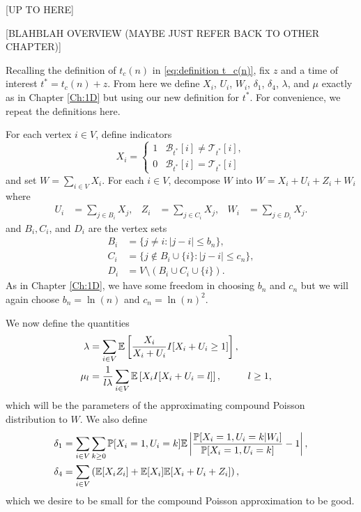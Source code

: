 [UP TO HERE]

[BLAHBLAH OVERVIEW (MAYBE JUST REFER BACK TO OTHER CHAPTER)]

Recalling the definition of $t_c(n)$ in \eqref{eq:definition t_c(n)}, fix $z$ and a time of interest $t^* = t_c(n) + z$. From here we define $X_i$, $U_i$, $W_i$, $\delta_1$, $\delta_4$, $\lambda$, and $\mu$ exactly as in Chapter \ref{Ch:1D} but using our new definition for $t^*$. For convenience, we repeat the definitions here.

For each vertex $i \in V$, define indicators
	\begin{equation}
		X_i = 
		\begin{cases}
			1 & \mathscr{B}_{t^*}[i] \neq \mathscr{T}_{t^*}[i],\\
			0 & \mathscr{B}_{t^*}[i] = \mathscr{T}_{t^*}[i]
		\end{cases}
	\end{equation}
	and set $W = \sum_{i \in V} X_i$.
	For each $i \in V$, decompose $W$ into $W = X_i + U_i + Z_i + W_i$ where
	\begin{align}
		U_i &= \sum_{j \in B_i} X_j, &
		Z_i &= \sum_{j \in C_i} X_j, &
		W_i &= \sum_{j \in D_i} X_j.
	\end{align}
	and $B_i, C_i$, and $D_i$ are the vertex sets
	\begin{align}
		B_i &= \{j\neq i : |j - i| \leq b_n \},\\
		C_i &= \{j\notin B_i\cup \{i\}: |j - i| \leq c_n \},\\
		D_i &= V \setminus (B_i \cup C_i \cup \{i\}).
	\end{align}
	As in Chapter \ref{Ch:1D}, we have some freedom in choosing $b_n$ and $c_n$ but we will again choose $b_n = \ln(n)$ and $c_n = \ln(n)^2$.

	We now define the quantities
	\begin{align}
		\lambda &= \sum_{i \in V} \mathbb{E}\left[\frac{X_i}{X_i + U_i} I[ X_i + U_i \geq 1] \right],\\
		\mu_l &= \frac{1}{l \lambda} \sum_{i \in V} \mathbb{E}\left[ X_i I[X_i + U_i = l] \right], && l\geq 1,
	\end{align}
	which will be the parameters of the approximating compound Poisson distribution to $W$. We also define
	\begin{align}
		\delta_1 &= \sum_{i \in V}  \sum_{k \geq 0} \mathbb{P}[X_i = 1, U_i = k] \mathbb{E} \left|\frac{\mathbb{P}[X_i = 1, U_i = k|W_i]}{\mathbb{P}[X_i = 1, U_i = k]} - 1 \right|, \label{eq:delta1 nD}\\ 
		\delta_4 &= \sum_{i \in V} \left( \mathbb{E}[X_i Z_i] + \mathbb{E}[X_i] \mathbb{E}[X_i + U_i + Z_i] \right), \label{eq:delta4 nD}
	\end{align}
	which we desire to be small for the compound Poisson approximation to be good.

